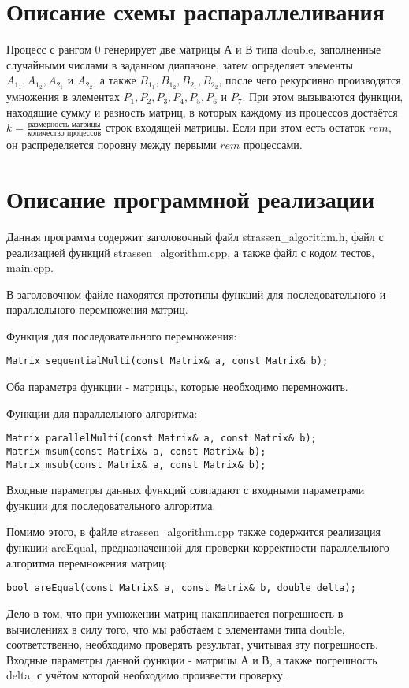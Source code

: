\documentclass{report}
\begin{document}
\section*{Описание схемы распараллеливания}
\par Процесс с рангом 0 генерирует две матрицы А и В типа double, заполненные случайными числами в заданном диапазоне, затем определяет элементы $A_1_1, A_1_2, A_2_1$ и $A_2_2$, а также $B_1_1, B_1_2, B_2_1, B_2_2$, после чего рекурсивно производятся умножения в элементах $P_1, P_2, P_3, P_4, P_5, P_6$ и $P_7$. При этом вызываются функции, находящие сумму и разность матриц, в которых каждому из процессов достаётся $k = \frac{\text{размерность матрицы}}{\text{количество процессов}}$ строк входящей матрицы. Если при этом есть остаток $rem$, он распределяется поровну между первыми $rem$ процессами.
\newpage

\section*{Описание программной реализации}
Данная программа содержит заголовочный файл strassen\_algorithm.h, файл с реализацией функций strassen\_algorithm.cpp, а также файл с кодом тестов, main.cpp.
\par В заголовочном файле находятся прототипы функций для последовательного и параллельного перемножения матриц.
\par Функция для последовательного перемножения:
\begin{lstlisting}
Matrix sequentialMulti(const Matrix& a, const Matrix& b);
\end{lstlisting}
Оба параметра функции - матрицы, которые необходимо перемножить.
\par Функции для параллельного
алгоритма:
\begin{lstlisting}
Matrix parallelMulti(const Matrix& a, const Matrix& b);
Matrix msum(const Matrix& a, const Matrix& b);
Matrix msub(const Matrix& a, const Matrix& b);
\end{lstlisting}
Входные параметры данных функций совпадают с входными параметрами функции для последовательного алгоритма.
\par Помимо этого, в файле strassen\_algorithm.cpp также содержится реализация функции areEqual, предназначенной для проверки корректности параллельного алгоритма перемножения матриц:
\begin{lstlisting}
bool areEqual(const Matrix& a, const Matrix& b, double delta);
\end{lstlisting}
Дело в том, что при умножении матриц накапливается погрешность в вычислениях в силу того, что мы работаем с элементами типа double, соответственно, необходимо проверять результат, учитывая эту погрешность. Входные параметры данной функции - матрицы А и В, а также погрешность delta, с учётом которой необходимо произвести проверку.
\newpage
\end{document}
